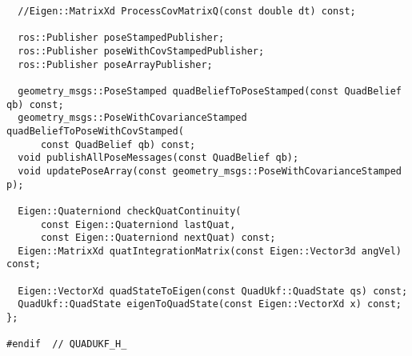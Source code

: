 \begin{verbatim}
  //Eigen::MatrixXd ProcessCovMatrixQ(const double dt) const;

  ros::Publisher poseStampedPublisher;
  ros::Publisher poseWithCovStampedPublisher;
  ros::Publisher poseArrayPublisher;

  geometry_msgs::PoseStamped quadBeliefToPoseStamped(const QuadBelief qb) const;
  geometry_msgs::PoseWithCovarianceStamped quadBeliefToPoseWithCovStamped(
      const QuadBelief qb) const;
  void publishAllPoseMessages(const QuadBelief qb);
  void updatePoseArray(const geometry_msgs::PoseWithCovarianceStamped p);

  Eigen::Quaterniond checkQuatContinuity(
      const Eigen::Quaterniond lastQuat,
      const Eigen::Quaterniond nextQuat) const;
  Eigen::MatrixXd quatIntegrationMatrix(const Eigen::Vector3d angVel) const;

  Eigen::VectorXd quadStateToEigen(const QuadUkf::QuadState qs) const;
  QuadUkf::QuadState eigenToQuadState(const Eigen::VectorXd x) const;
};

#endif  // QUADUKF_H_
\end{verbatim}